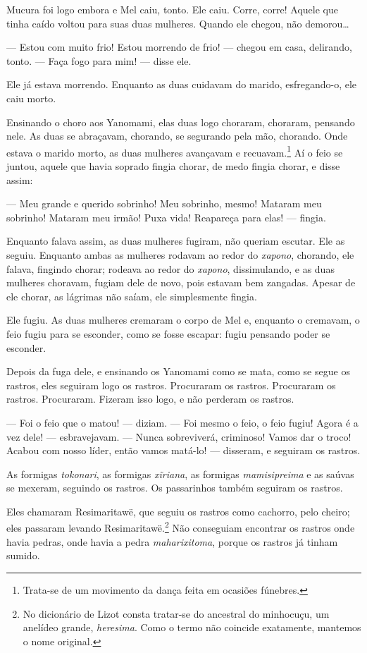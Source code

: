 Mucura foi logo embora e Mel caiu, tonto. Ele caiu. Corre, corre! Aquele
que tinha caído voltou para suas duas mulheres. Quando ele chegou, não
demorou\ldots{}

 --- Estou com muito frio! Estou morrendo de frio! --- chegou em casa,
delirando, tonto. --- Faça fogo para mim! --- disse ele. 

Ele já estava morrendo. Enquanto as duas cuidavam do marido,
esfregando-o, ele caiu morto. 

Ensinando o choro aos Yanomami, elas duas logo choraram, choraram,
pensando nele. As duas se abraçavam, chorando, se segurando pela mão,
chorando. Onde estava o marido morto, as duas mulheres avançavam e
recuavam.\footnote{Trata-se de um movimento da dança feita em ocasiões fúnebres.} Aí o feio se juntou, aquele que havia
soprado fingia chorar, de medo fingia chorar, e disse assim:

--- Meu grande e querido sobrinho! Meu sobrinho, mesmo! Mataram meu
sobrinho! Mataram meu irmão! Puxa vida! Reapareça para elas! ---
fingia. 

Enquanto falava assim, as duas mulheres fugiram, não queriam escutar.
 Ele as seguiu. Enquanto ambas as mulheres rodavam ao redor do \textit{xapono},
 chorando, ele falava, fingindo chorar; rodeava ao redor do
 \textit{xapono}, dissimulando, e as duas mulheres choravam, fugiam dele de novo,
 pois estavam bem zangadas. Apesar de ele chorar, as lágrimas não saíam,
 ele simplesmente fingia. 

Ele fugiu. As duas mulheres cremaram o corpo de Mel e, enquanto o
cremavam, o feio fugiu para se esconder, como se fosse escapar: fugiu
pensando poder se esconder. 

Depois da fuga dele, e ensinando os Yanomami como se mata, como se segue os
rastros, eles seguiram logo os rastros. Procuraram os rastros.
Procuraram os rastros. Procuraram. Fizeram isso logo, e não perderam os
rastros. 

--- Foi o feio que o matou! --- diziam. --- Foi mesmo o feio, o feio
fugiu! Agora é a vez dele! --- esbravejavam. --- Nunca sobreviverá,
criminoso! Vamos dar o troco! Acabou com nosso líder, então vamos
matá-lo! --- disseram, e seguiram os rastros. 

As formigas \textit{tokonari}, as formigas \textit{xĩriana}, as
formigas \textit{mamisipreima} e as saúvas se mexeram, seguindo os
rastros. Os passarinhos também seguiram os rastros.

Eles chamaram {Resimaritawë}, que seguiu os rastros como cachorro,
pelo cheiro; eles passaram levando Resimaritawë.\footnote{No dicionário de Lizot consta tratar-se do ancestral do minhocuçu, um anelídeo grande, \textit{heresima}. Como o termo não coincide exatamente, mantemos o nome original.} Não conseguiam encontrar os rastros onde havia pedras, onde havia a
pedra \textit{maharixitoma}, porque os rastros já tinham sumido. 

